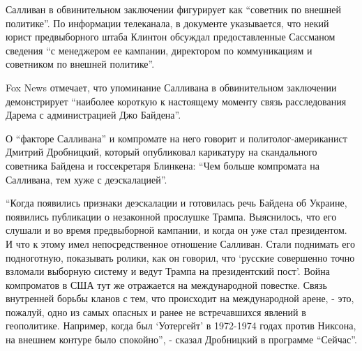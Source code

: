 Салливан в обвинительном заключении фигурирует как \enquote{советник по внешней
политике}. По информации телеканала, в документе указывается, что некий юрист
предвыборного штаба Клинтон обсуждал предоставленные Сассманом сведения \enquote{с
менеджером ее кампании, директором по коммуникациям и советником по внешней
политике}.

Fox News отмечает, что упоминание Салливана в обвинительном заключении
демонстрирует \enquote{наиболее короткую к настоящему моменту связь расследования
Дарема с администрацией Джо Байдена}.  

О \enquote{факторе Салливана} и компромате на него говорит и политолог-американист
Дмитрий Дробницкий, который опубликовал карикатуру на скандального советника
Байдена и госсекретаря Блинкена: \enquote{Чем больше компромата на Салливана, тем хуже
с деэскалацией}.


\enquote{Когда появились признаки деэскалации и готовилась речь Байдена об Украине,
появились публикации о незаконной прослушке Трампа. Выяснилось, что его слушали
и во время предвыборной кампании, и когда он уже стал президентом. И что к
этому имел непосредственное отношение Салливан. Стали поднимать его
подноготную, показывать ролики, как он говорил, что \enquote{русские совершенно точно
взломали выборную систему и ведут Трампа на президентский пост}. Война
компроматов в США тут же отражается на международной повестке. Связь внутренней
борьбы кланов с тем, что происходит на международной арене, - это, пожалуй,
одно из самых опасных и ранее не встречавшихся явлений в геополитике. Например,
когда был \enquote{Уотергейт} в 1972-1974 годах против Никсона, на внешнем контуре было
спокойно}, - сказал Дробницкий в программе \enquote{Сейчас}.
